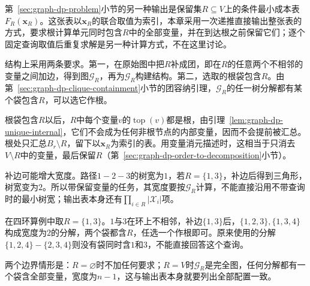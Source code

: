 第~\ref{sec:graph-dp-problem}小节的另一种输出是保留集$R\subseteq V$上的条件最小成本表$F_R(\bm x_R)$。这张表以$\bm x_R$的联合取值为索引，本章采用一次递推直接输出整张表的方式，要求根计算单元同时包含$R$中的全部变量，并在到达根之前保留它们；逐个固定查询取值后重复求解是另一种计算方式，不在这里讨论。

结构上采用两条要求。第一，在原始图中把$R$补成团，即在$R$的任意两个不相邻的变量之间加边，得到图$\mathcal G_R$，再为$\mathcal G_R$构建结构。第二，选取的根袋包含$R$。由第~\ref{sec:graph-dp-clique-containment}小节的团容纳引理，$\mathcal G_R$的任一树分解都有某个袋包含$R$，可以选它作根。

根袋包含$R$以后，$R$中每个变量$v$的$\operatorname{top}(v)$都是根，由引理~\ref{lem:graph-dp-unique-internal}，它们不会成为任何非根节点的内部变量，因而不会提前被汇总。根处只汇总$B_r\setminus R$，留下以$\bm x_R$为索引的表。用变量消元描述时，这相当于只消去$V\setminus R$中的变量，最后保留$R$（第~\ref{sec:graph-dp-order-to-decomposition}小节）。

补边可能增大宽度。路径$1-2-3$的树宽为$1$，若$R=\{1,3\}$，补边后得到三角形，树宽变为$2$。所以带保留变量的任务，其宽度要按$\mathcal G_R$计算，不能直接沿用不带查询时的最小树宽；输出表本身还有$\prod_{i\in R}|\mathcal X_i|$项。

在四环算例中取$R=\{1,3\}$。$1$与$3$在环上不相邻，补边$\{1,3\}$后，$\{1,2,3\},\{1,3,4\}$构成宽度为$2$的分解，两个袋都含$R$，任选一个作根即可。原来使用的分解$\{1,2,4\}-\{2,3,4\}$则没有袋同时含$1$和$3$，不能直接回答这个查询。

两个边界情形是：$R=\varnothing$时不加任何要求；$R=V$时$\mathcal G_R$是完全图，任何分解都有一个袋含全部变量，宽度为$n-1$，这与输出表本身就要列出全部配置一致。
